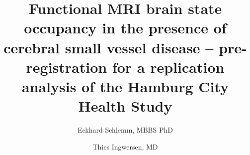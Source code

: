 \documentclass[12pt,biorxiv,lineno,doublespacing]{lapreprint}
\title{Functional MRI brain state occupancy in the presence of cerebral small vessel disease -- pre-registration for a replication analysis of the Hamburg City Health Study}
\author[ \orcidlink{0000-0002-5729-2935} 1 \Letter]{Eckhard Schlemm, MBBS PhD}
\author[ 1]{Thies Ingwersen, MD}
\affil[1]{Department of Neurology, University Medical Center Hamburg-Eppendorf}
\begin{document}
\maketitle






\printbibliography

\if@endfloat\clearpage\processdelayedfloats\clearpage\fi 



%     

%     



\end{document}
